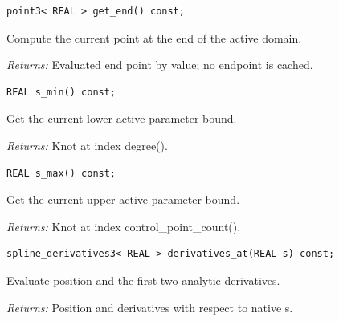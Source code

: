 \par\noindent\begin{minipage}{\linewidth}
\begin{lstlisting}[style=apireference]
point3< REAL > get_end() const;
\end{lstlisting}
{\footnotesize Compute the current point at the end of the active domain.\par}
{\footnotesize\textit{Returns:} Evaluated end point by value; no endpoint is cached.\par}
\end{minipage}\par\vspace{1pt}
\par\noindent\begin{minipage}{\linewidth}
\begin{lstlisting}[style=apireference]
REAL s_min() const;
\end{lstlisting}
{\footnotesize Get the current lower active parameter bound.\par}
{\footnotesize\textit{Returns:} Knot at index degree().\par}
\end{minipage}\par\vspace{1pt}
\par\noindent\begin{minipage}{\linewidth}
\begin{lstlisting}[style=apireference]
REAL s_max() const;
\end{lstlisting}
{\footnotesize Get the current upper active parameter bound.\par}
{\footnotesize\textit{Returns:} Knot at index control\_point\_count().\par}
\end{minipage}\par\vspace{1pt}
\par\noindent\begin{minipage}{\linewidth}
\begin{lstlisting}[style=apireference]
spline_derivatives3< REAL > derivatives_at(REAL s) const;
\end{lstlisting}
{\footnotesize Evaluate position and the first two analytic derivatives.\par}
{\footnotesize\textit{Returns:} Position and derivatives with respect to native s.\par}
\end{minipage}\par\vspace{1pt}
